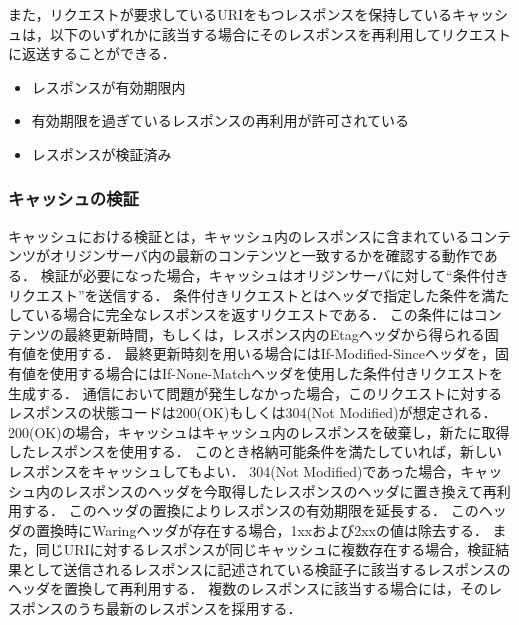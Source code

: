 \documentclass{css}
\begin{document}
また，リクエストが要求しているURIをもつレスポンスを保持しているキャッシュは，以下のいずれかに該当する場合にそのレスポンスを再利用してリクエストに返送することができる．

\begin{itemize}
\item レスポンスが有効期限内
\item 有効期限を過ぎているレスポンスの再利用が許可されている
\item レスポンスが検証済み
\end{itemize}

\subsubsection{キャッシュの検証}
キャッシュにおける検証とは，キャッシュ内のレスポンスに含まれているコンテンツがオリジンサーバ内の最新のコンテンツと一致するかを確認する動作である．
検証が必要になった場合，キャッシュはオリジンサーバに対して``条件付きリクエスト''を送信する．
条件付きリクエストとはヘッダで指定した条件を満たしている場合に完全なレスポンスを返すリクエストである．
この条件にはコンテンツの最終更新時間，もしくは，レスポンス内のEtagヘッダから得られる固有値を使用する．
最終更新時刻を用いる場合にはIf-Modified-Sinceヘッダを，固有値を使用する場合にはIf-None-Matchヘッダを使用した条件付きリクエストを生成する．
通信において問題が発生しなかった場合，このリクエストに対するレスポンスの状態コードは200(OK)もしくは304(Not Modified)が想定される．
200(OK)の場合，キャッシュはキャッシュ内のレスポンスを破棄し，新たに取得したレスポンスを使用する．
このとき格納可能条件を満たしていれば，新しいレスポンスをキャッシュしてもよい．
304(Not Modified)であった場合，キャッシュ内のレスポンスのヘッダを今取得したレスポンスのヘッダに置き換えて再利用する．
このヘッダの置換によりレスポンスの有効期限を延長する．
このヘッダの置換時にWaringヘッダが存在する場合，1xxおよび2xxの値は除去する．
また，同じURIに対するレスポンスが同じキャッシュに複数存在する場合，検証結果として送信されるレスポンスに記述されている検証子に該当するレスポンスのヘッダを置換して再利用する．
複数のレスポンスに該当する場合には，そのレスポンスのうち最新のレスポンスを採用する．
\end{document}

